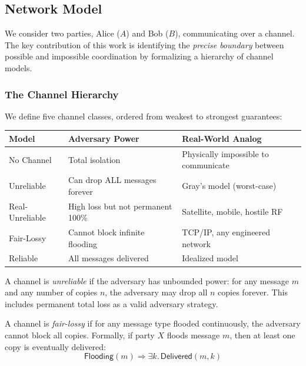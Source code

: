 
\subsection{Network Model}

We consider two parties, Alice ($A$) and Bob ($B$), communicating over a channel. The key contribution of this work is identifying the \emph{precise boundary} between possible and impossible coordination by formalizing a hierarchy of channel models.

\subsubsection{The Channel Hierarchy}

We define five channel classes, ordered from weakest to strongest guarantees:

\begin{center}
\begin{tabular}{llp{5.5cm}}
\toprule
\textbf{Model} & \textbf{Adversary Power} & \textbf{Real-World Analog} \\
\midrule
No Channel & Total isolation & Physically impossible to communicate \\
Unreliable & Can drop ALL messages forever & Gray's model (worst-case) \\
Real-Unreliable & High loss but not permanent 100\% & Satellite, mobile, hostile RF \\
Fair-Lossy & Cannot block infinite flooding & TCP/IP, any engineered network \\
Reliable & All messages delivered & Idealized model \\
\bottomrule
\end{tabular}
\end{center}

\begin{definition}
A channel is \emph{unreliable} if the adversary has unbounded power: for any message $m$ and any number of copies $n$, the adversary may drop all $n$ copies forever. This includes permanent total loss as a valid adversary strategy.
\end{definition}

\begin{definition}
\label{def:fairlossy}
A channel is \emph{fair-lossy} if for any message type flooded continuously, the adversary cannot block all copies. Formally, if party $X$ floods message $m$, then at least one copy is eventually delivered:
\[
\textsf{Flooding}(m) \Rightarrow \exists k.\, \textsf{Delivered}(m, k)
\]
\end{definition}

